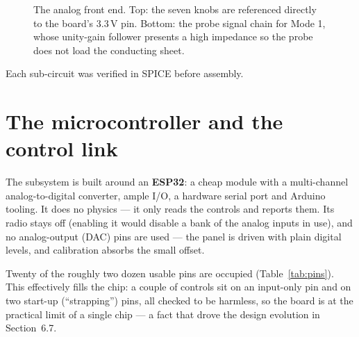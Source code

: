 \documentclass[11pt]{report}
\begin{document}
\begin{figure}[ht]
\centering
{}
\caption{The analog front end. Top: the seven knobs are referenced directly to the board's 3.3\,V pin. Bottom: the probe signal chain for Mode 1, whose unity-gain follower presents a high impedance so the probe does not load the conducting sheet.}
\label{fig:afe}
\end{figure}

Each sub-circuit was verified in SPICE before assembly.

\section{The microcontroller and the control link}

The subsystem is built around an \textbf{ESP32}: a cheap module with a multi-channel analog-to-digital converter, ample I/O, a hardware serial port and Arduino tooling. It does no physics --- it only reads the controls and reports them. Its radio stays off (enabling it would disable a bank of the analog inputs in use), and no analog-output (DAC) pins are used --- the panel is driven with plain digital levels, and calibration absorbs the small offset.

Twenty of the roughly two dozen usable pins are occupied (Table~\ref{tab:pins}). This effectively fills the chip: a couple of controls sit on an input-only pin and on two start-up (``strapping'') pins, all checked to be harmless, so the board is at the practical limit of a single chip --- a fact that drove the design evolution in Section~6.7.
\end{document}
